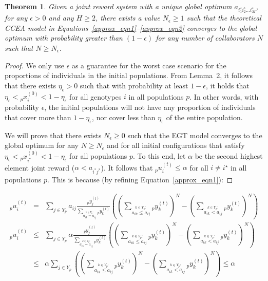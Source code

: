 \documentclass{sig-alt-full}
\newtheorem{theorem}{Theorem}
\newcommand\suma[1]{\displaystyle\sum_{#1}}
\newcommand\sumb[2]{\displaystyle\sum_{\stackrel{{#1} :}{#2}}}
\begin{document}
\begin{multicols}{2}
\begin{theorem}
Given a joint reward system with a unique global optimum $a_{i_1^\star i_2^\star ... i_M^\star}$, for any $\epsilon > 0$ and any $H \geq 2$, there exists a value $N_\epsilon \geq 1$ such that the theoretical CCEA model in Equations~\ref{approx_eqn1}--\ref{approx_eqn2} converges to the global optimum with probability greater than $\left(1-\epsilon\right)$ for any number of collaborators $N$ such that $N \geq N_\epsilon$.\end{theorem}

\begin{proof}
We only use $\epsilon$ as a guarantee for the worst case scenario for the proportions of individuals in the initial populations.  From Lemma~2, it follows that there exists $\eta_\epsilon>0$ such that with probability at least $1-\epsilon$, it holds that $\eta_\epsilon < {_p}x^{(0)}_i < 1 - \eta_\epsilon$ for all genotypes $i$ in all populations $p$.  In other words, with probability $\epsilon$, the initial populations will not have any proportion of individuals that cover more than $1-\eta_\epsilon$, nor cover less than $\eta_\epsilon$ of the entire population.

We will prove that there exists \mbox{$N_\epsilon \geq 0$} such that the EGT model converges to the global optimum for any $N \geq N_\epsilon$ and for all initial configurations that satisfy \mbox{$\eta_\epsilon < {_p}x^{(0)}_{i^\star} < 1 - \eta_\epsilon$} for all populations $p$.  To this end, let $\alpha$ be the second highest element joint reward ($\alpha < a_{i^* j^*}$).    It follows that ${_p}u^{(t)}_i \leq \alpha$ for all $i \neq i^\star$ in all populations $p$. This is because (by refining Equation~\ref{approx_eqn1}):
\renewcommand\qed{}
\end{proof}
\end{multicols}

\vspace{-4em}
\noindent\begin{eqnarray*}
{_p}u^{(t)}_i & = & \suma{j \in Y_{p}} { a_{i j} \frac{{_p}y^{(t)}_j}{\sumb{k \in Y_{p}}{a_{i k} = a_{i j}} {_p}y^{(t)}_k} \left( \left( \sumb{k \in Y_{p}}{a_{i k} \leq a_{i j} } {_p}y^{(t)}_k \right)^N - \left( \sumb{k \in Y_{p}}{a_{i k} < a_{i j} } {_p}y^{(t)}_k \right)^N \right) }\\
{_p}u^{(t)}_i & \leq & \suma{j \in Y_{p}} { \alpha \frac{{_p}y^{(t)}_j}{\sumb{k \in Y_{p}}{a_{i k} = a_{i j}} {_p}y^{(t)}_k} \left( \left( \sumb{k \in Y_{p}}{a_{i k} \leq a_{i j} } {_p}y^{(t)}_k \right)^N - \left( \sumb{k \in Y_{p}}{a_{i k} < a_{i j} } {_p}y^{(t)}_k \right)^N \right) }\\
& \leq & \alpha \suma{j \in Y_{p}} { \left( \left( \sumb{k \in Y_{p}}{a_{i k} \leq a_{i j} } {_p}y^{(t)}_k \right)^N - \left( \sumb{k \in Y_{p}}{a_{i k} < a_{i j} } {_p}y^{(t)}_k \right)^N \right) } \leq \alpha
\end{eqnarray*}
\end{document}
